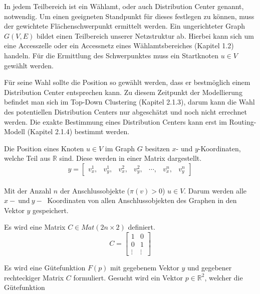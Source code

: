\vspace{0.5cm}

In jedem Teilbereich ist ein Wählamt, oder auch Distribution Center genannt, notwendig.
Um einen geeigneten Standpunkt für dieses festlegen zu können, muss der gewichtete Flächenschwerpunkt ermittelt werden.
Ein ungerichteter Graph $G(V,E)$ bildet einen Teilbereich unserer Netzstruktur ab.  Hierbei kann sich um eine Accesszelle oder ein Accessnetz
eines Wählamtsbereiches (Kapitel 1.2) handeln. Für die Ermittlung des Schwerpunktes muss ein Startknoten $u \in V $  gewählt werden\cite{krumke1}. 
\par Für seine Wahl sollte die Position so gewählt werden, dass er bestmöglich einem Distribution Center entsprechen kann. Zu diesem Zeitpunkt
der Modellierung befindet man sich im Top-Down Clustering (Kapitel 2.1.3), darum kann die Wahl des potentiellen Distribution Centers nur 
abgeschätzt und noch nicht errechnet werden. Die exakte Bestimmung eines Distribution Centers kann erst im Routing-Modell (Kapitel 2.1.4) bestimmt werden.

\vspace{0.5cm}

Die Position eines Knoten $u\in V$ im Graph $G$ besitzen $x$- und $y$-Koordinaten, welche Teil aus $ \mathbb{R} $ sind. Diese werden in einer Matrix
dargestellt.	
\\
\begin{equation}
		y =
			\begin{bmatrix}
 				v_{x}^1, & v_{y}^1, & v_{x}^2, & v_{y}^2, & \cdots,& v_{x}^n, & v_{y}^n
			\end{bmatrix}
\end{equation}
\\
Mit der Anzahl $n$ der Anschlussobjekte ($\pi(v)>0$) $u\in V$. Darum werden alle $x-~$und$~y-~$ Koordinaten von allen Anschlussobjekten des
Graphen in den Vektor $y$ gespeichert.

\vspace{0.3cm}
Es wird eine Matrix $C \in Mat(2n\times 2)$ definiert.
	\begin{equation}
		C =
			\begin{bmatrix}
 				1 & 0 \\
 				0 & 1 \\
 				\vdots & \vdots
 			\end{bmatrix}
	\end{equation}
	
	
Es wird eine Gütefunktion $F(p)$ mit gegebenem Vektor $y$ und gegebener rechteckiger Matrix $C$ formuliert. Gesucht wird ein Vektor $p\in 
\mathbb{R}^{2}$, welcher die Gütefunktion

